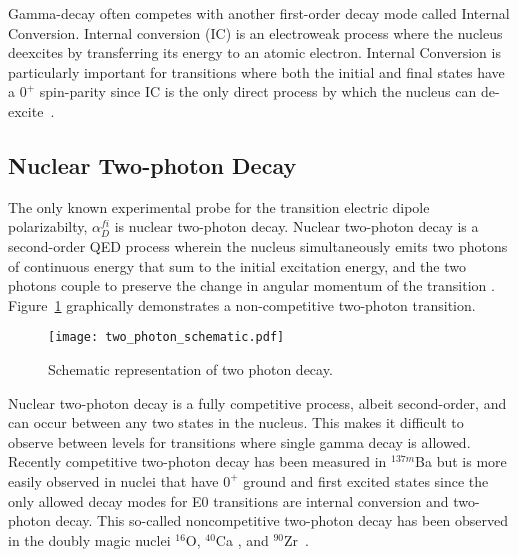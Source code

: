 \documentclass[cnatzke_thesis_proposal.tex]{subfiles}
\begin{document}
Gamma-decay often competes with another first-order decay mode called Internal Conversion. 
Internal conversion (IC) is an electroweak process where the nucleus deexcites by transferring its energy to an atomic electron. 
Internal Conversion is particularly important for transitions where both the initial and final states have a $0^+$ spin-parity since IC is the only direct process by which the nucleus can de-excite~\cite{krane_introductory_1987}.

\subsection{Nuclear Two-photon Decay}

The only known experimental probe for the transition electric dipole polarizabilty, $\alpha_D^{fi}$ is nuclear two-photon decay.
Nuclear two-photon decay is a second-order QED process wherein the nucleus simultaneously emits two photons of continuous energy that sum to the initial excitation energy, and the two photons couple to preserve the change in angular momentum of the transition \cite{kramp_nuclear_1987}.
Figure~\ref{fig:two_photon_schematic} graphically demonstrates a non-competitive two-photon transition.

\begin{figure}[H]
    \centering
    \texttt{[image: two\_photon\_schematic.pdf]}
    \caption{Schematic representation of two photon decay.}
    \label{fig:two_photon_schematic}
\end{figure}

Nuclear two-photon decay is a fully competitive process, albeit second-order, and can occur between any two states in the nucleus. 
This makes it difficult to observe between levels  for transitions where single gamma decay is allowed. Recently competitive two-photon decay has been measured in $^{137m}$Ba \cite{soderstrom_electromagnetic_2020} but is more easily observed in nuclei that have $0^+$ ground and first excited states since the only allowed decay modes for E0 transitions are internal conversion and two-photon decay. 
This so-called noncompetitive two-photon decay has been observed in the doubly magic nuclei $^{16}$O, $^{40}$Ca \cite{schirmer_double_1984}, and $^{90}$Zr~\cite{schirmer_double_1984}. 

\end{document}
